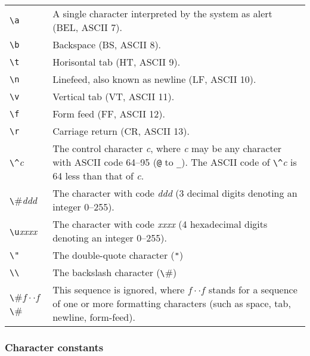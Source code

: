 \documentclass[fleqn]{article}
\begin{document}
\begin{quot}
\begin{tabular}{@{}lp{5in}}
  \verb#\a# & A single character interpreted by the system as
  alert (BEL, ASCII 7). \\ 

  \verb#\b# & Backspace (BS, ASCII 8).\\ 

  \verb#\t# & Horisontal tab (HT, ASCII 9).\\ 

  \verb#\n# & Linefeed, also known as newline (LF, ASCII 10). \\ 

  \verb#\v# & Vertical tab (VT, ASCII 11).\\ 

  \verb#\f# & Form feed (FF, ASCII 12).\\ 
 
 \verb#\r# & Carriage return (CR, ASCII 13).\\ 

  \verb#\^#{\it c\/} & The control character {\it c\/}, where {\it
    c\/} may be any character with ASCII code 64--95 (\verb#@# to
  \verb#_#).  The ASCII code of \verb#\^#{\it c\/} is 64 less than
  that of {\it c\/}.\\ 

  \verb#\#{\it ddd\/} & The character with code {\it ddd\/} (3 decimal
  digits denoting an integer 0--255).\\ 

  \verb#\u#{\it xxxx\/} & The character with code {\it xxxx\/} (4 hexadecimal
  digits denoting an integer 0--255).\\ 

\verb#\"# & The double-quote character ({\tt "})\\

\verb#\\# & The backslash character (\verb#\#)\\

\verb#\#$f\cdot\cdot f$\verb#\# & This sequence is ignored, where
$f\cdot\cdot f$ stands for a sequence of one or more formatting
characters (such as space, tab, newline, form-feed).
\end{tabular}
\end{quot}


\subsubsection*{Character constants}
\end{document}
